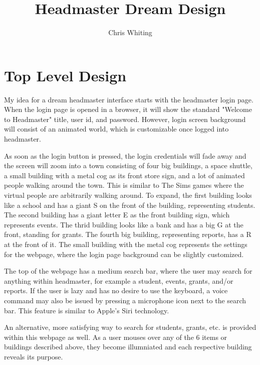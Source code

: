 \documentclass[11pt]{article}
\title{Headmaster Dream Design}
\author{Chris Whiting}
\begin{document}
\maketitle

 
\section{Top Level Design}
My idea for a dream headmaster interface starts with the headmaster login page. When the login page is opened in a browser, it will show the standard "Welcome to Headmaster" title, user id, and password. However, login screen background will consist of an animated world, which is customizable once logged into headmaster.

As soon as the login button is pressed, the login credentials will fade away and the screen will zoom into a town consisting of four big buildings, a space shuttle, a small building with a metal cog as its front store sign, and a lot of animated people walking around the town. This is similar to The Sims games where the virtual people are arbitrarily walking around. To expand, the first building looks like a school and has a giant S on the front of the building, representing students. The second building has a giant letter E as the front building sign, which represents events. The thrid building looks like a bank and has a big G at the front, standing for grants. The fourth big building, representing reports, has a R at the front of it. The small building with the metal cog represents the settings for the webpage, where the login page background can be slightly customized.

 The top of the webpage has a medium search bar, where the user may search for anything within headmaster, for example a student, events, grants, and/or reports. If the user is lazy and has no desire to use the keyboard, a voice command may also be issued by pressing a microphone icon next to the search bar. This feature is similar to Apple's Siri technology. 

An alternative, more satisfying way to search for students, grants, etc. is provided within this webpage as well. As a user mouses over any of the 6 items or buildings described above, they become illumniated and each respective building reveals its purpose. 
\end{document}

